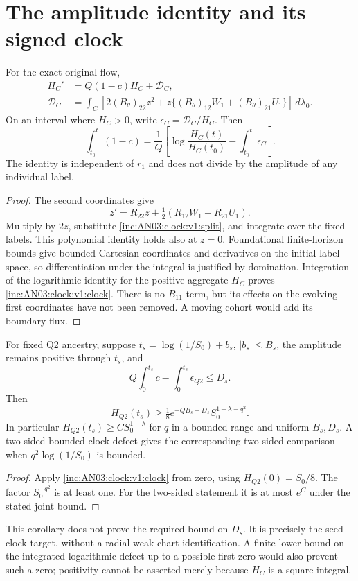 \documentclass[11pt]{article}
\numberwithin{equation}{section}
\theoremstyle{remark}\newtheorem{remark}[theorem]{Remark}
\newcommand{\dd}{\,d}\newcommand{\E}{\mathbb E}\newcommand{\R}{\mathbb R}
\begin{document}
\section{The amplitude identity and its signed clock}
\begin{proposition}\label{inc:AN03:clock:v1:identity}
For the exact original flow,
\begin{align}
 H_C'&=Q(1-c)H_C+\mathcal D_C,\label{inc:AN03:clock:v1:Hidentity}\\
 \mathcal D_C&=\int_C\left[2(B_\theta)_{22}z^2
       +z\{(B_\theta)_{12}W_1+(B_\theta)_{21}U_1\}\right]\dd\lambda_0.\nonumber
\end{align}
On an interval where $H_C>0$, write $\epsilon_C=\mathcal D_C/H_C$. Then
\begin{equation}\label{inc:AN03:clock:v1:clock}
 \int_{t_0}^{t}(1-c)
 =\frac1Q\left[\log\frac{H_C(t)}{H_C(t_0)}-\int_{t_0}^{t}\epsilon_C\right].
\end{equation}
The identity is independent of $r_1$ and does not divide by the amplitude of any individual label.
\end{proposition}
\begin{proof}
The second coordinates give
\[
 z'=R_{22}z+\tfrac12(R_{12}W_1+R_{21}U_1).
\]
Multiply by $2z$, substitute \eqref{inc:AN03:clock:v1:split}, and integrate over the fixed labels. This polynomial identity holds also at $z=0$. Foundational finite-horizon bounds give bounded Cartesian coordinates and derivatives on the initial label space, so differentiation under the integral is justified by domination. Integration of the logarithmic identity for the positive aggregate $H_C$ proves \eqref{inc:AN03:clock:v1:clock}. There is no $B_{11}$ term, but its effects on the evolving first coordinates have not been removed. A moving cohort would add its boundary flux.
\end{proof}

\begin{corollary}\label{inc:AN03:clock:v1:seed}
For fixed Q2 ancestry, suppose $t_s=\log(1/S_0)+b_s$, $|b_s|\le B_s$, the amplitude remains positive through $t_s$, and
\[
 Q\int_0^{t_s}c-\int_0^{t_s}\epsilon_{Q2}\le D_s.
\]
Then
\[
 H_{Q2}(t_s)\ge\tfrac18e^{-QB_s-D_s}S_0^{1-\lambda-q^2}.
\]
In particular $H_{Q2}(t_s)\ge C S_0^{1-\lambda}$ for $q$ in a bounded range and uniform $B_s,D_s$. A two-sided bounded clock defect gives the corresponding two-sided comparison when $q^2\log(1/S_0)$ is bounded.
\end{corollary}
\begin{proof}
Apply \eqref{inc:AN03:clock:v1:clock} from zero, using $H_{Q2}(0)=S_0/8$. The factor $S_0^{-q^2}$ is at least one. For the two-sided statement it is at most $e^C$ under the stated joint bound.
\end{proof}
\noindent This corollary does not prove the required bound on $D_s$. It is precisely the seed-clock target, without a radial weak-chart identification. A finite lower bound on the integrated logarithmic defect up to a possible first zero would also prevent such a zero; positivity cannot be asserted merely because $H_C$ is a square integral.
\end{document}
